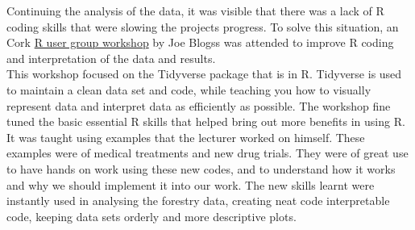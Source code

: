 \documentclass[a4paper,11pt,twoside]{report}
\begin{document}
Continuing the analysis of the data, it was visible that there was a lack of R coding skills that were slowing the projects progress. To solve this situation, an Cork \href{https://www.meetup.com/Cork-Ireland-R-Users-Group/}{R user group workshop} by Joe Blogss was attended to improve R coding and interpretation of the data and results.\\
This workshop focused on the Tidyverse package that is in R. Tidyverse is used to maintain a clean data set and code, while teaching you how to visually represent data and interpret data as efficiently as possible. The workshop fine tuned the basic essential R skills that helped bring out more benefits in using R.\\
It was taught using examples that the lecturer worked on himself. These examples were of medical treatments and new drug trials. They were of great use to have hands on work using these new codes, and to understand how it works and why we should implement it into our work. The new skills learnt were instantly used in analysing the forestry data, creating neat code interpretable code, keeping data sets orderly and more descriptive plots.\\
\end{document}
